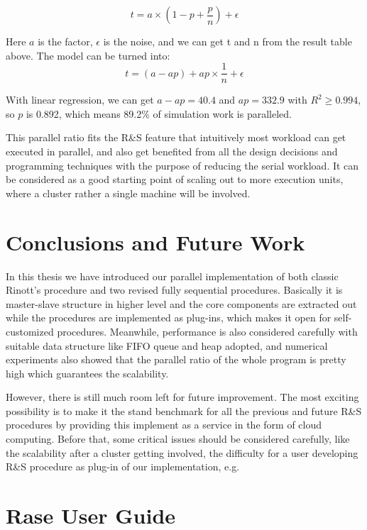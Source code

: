 \documentclass[12pt,a4paper]{report}
\begin{document}
$$ t = a \times (1 - p + \frac{p}{n}) + \epsilon $$

Here $a$ is the factor, $\epsilon$ is the noise, and we can get t and n from the result table above. The model can be turned into: 
$$ t = (a - ap) + ap \times \frac{1}{n} + \epsilon $$

With linear regression, we can get $a - ap = 40.4$ and $ap = 332.9$ with $R^2 \geqslant 0.994$, so $p$ is 0.892, which means 89.2\% of simulation work is paralleled.

This parallel ratio fits the R\&S feature that intuitively most workload can get executed in parallel, and also get benefited from all the design decisions and programming techniques with the purpose of reducing the serial workload. It can be considered as a good starting point of scaling out to more execution units, where a cluster rather a single machine will be involved.

\chapter{Conclusions and Future Work}

In this thesis we have introduced our parallel implementation of both classic Rinott's procedure and two revised fully sequential procedures. Basically it is master-slave structure in higher level and the core components are extracted out while the procedures are implemented as plug-ins, which makes it open for self-customized procedures. Meanwhile, performance is also considered carefully with suitable data structure like FIFO queue and heap adopted, and numerical experiments also showed that the parallel ratio of the whole program is pretty high which guarantees the scalability.

However, there is still much room left for future improvement. The most exciting possibility is to make it the stand benchmark for all the previous and future R\&S procedures by providing this implement as a service in the form of cloud computing. Before that, some critical issues should be considered carefully, like the scalability after a cluster getting involved, the difficulty for a user developing R\&S procedure as plug-in of our implementation, e.g.

\newpage
{}
\appendix

\chapter{Rase User Guide}
\end{document}
